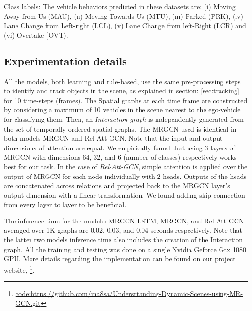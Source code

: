 \documentclass[letterpaper, 10 pt, conference]{ieeeconf}
\begin{document}
Class labels: The vehicle behaviors predicted in these datasets are: (i) Moving Away from Us (MAU), (ii) Moving Towards Us (MTU), (iii) Parked (PRK), (iv) Lane Change from Left-right (LCL), (v) Lane Change from left-Right (LCR) and (vi) Overtake (OVT).

\subsection{Experimentation details}
All the models, both learning and rule-based, use the same pre-processing steps to identify and track objects in the scene, as explained in section: \ref{sec:tracking} for  10 time-steps (frames). The Spatial graphs at each time frame are constructed by considering a maximum of 10 vehicles in the scene nearest to the ego-vehicle for classifying them. Then, an \textit{Interaction graph} is independently generated from the set of  temporally ordered spatial graphs. The MRGCN used is identical in both models MRGCN and Rel-Att-GCN. Note that the input and output dimensions of attention are equal. We empirically found that using 3 layers of MRGCN with dimensions 64, 32, and 6 (number of classes) respectively works best for our task. In the case of \textit{Rel-Att-GCN}, simple attention is applied over the output of MRGCN for each node individually with 2 heads. Outputs of the heads are concatenated across relations and projected back to the MRGCN layer's output dimension with a linear transformation. We found adding skip connection from every layer  to  layer to be beneficial. 

The inference time for the models: MRGCN-LSTM, MRGCN, and Rel-Att-GCN averaged over 1K graphs are 0.02, 0.03, and 0.04 seconds respectively. Note that the latter two models inference time also includes the creation of the Interaction graph. All the training and testing was done on a single Nvidia Geforce Gtx 1080 GPU. More details regarding the implementation can be found on our project website,  \footnote{\href{https://github.com/ma8sa/Undersrtanding-Dynamic-Scenes-using-MR-GCN.git}{code:https://github.com/ma8sa/Undersrtanding-Dynamic-Scenes-using-MR-GCN.git}}.
\end{document}
